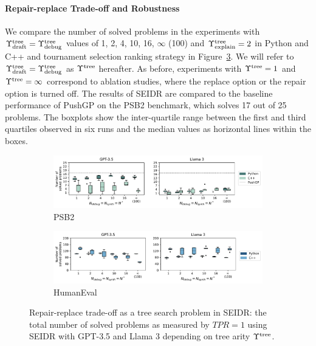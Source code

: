 \newpage
\paragraph{Repair-replace Trade-off and Robustness}
\label{sec:seidr-treearity-ollama}\label{sec:seidr-results-rqllama}

We compare the number of solved problems in the experiments with $\Upsilon^\text{tree}_\text{draft}=\Upsilon^\text{tree}_\text{debug}$ values of 1, 2, 4, 10, 16, $\infty$ (100) and $\Upsilon^\text{tree}_\text{explain}=2$ in Python and C++ and tournament selection ranking strategy in Figure~\ref{fig:repair-replace-trade-off-generalizability}. 
We will refer to  $\Upsilon^\text{tree}_\text{draft}=\Upsilon^\text{tree}_\text{debug}$ as $\Upsilon^\text{tree}$ hereafter.
As before, experiments with $\Upsilon^\text{tree}=1$ and $\Upsilon^\text{tree}=\infty$ correspond to ablation studies, where the replace option or the repair option is turned off. 
The results of SEIDR are compared to the baseline performance of PushGP on the PSB2 benchmark, which solves 17 out of 25 problems. 
The boxplots show the inter-quartile range between the first and third quartiles observed in six runs and the median values as horizontal lines within the boxes. 

\begin{figure}
\begin{subfigure}{\linewidth}
\centering
\includegraphics[width=\linewidth, trim={0mm 0mm 0mm 0mm}]{images/num_solved_problem_psb2_6runs_boxplot_v5.pdf}
  \caption{PSB2}
  \label{fig:num-solved-psb2-gpt3.5}
\end{subfigure}
\begin{subfigure}{\linewidth}
\centering
\includegraphics[width=\linewidth, trim={0mm 0mm 0mm 0mm}]{images/num_solved_problem_humaneval_6runs_boxplot_v5.pdf}
  \caption{HumanEval}
  \label{fig:num-solved-he-gpt3.5}
\end{subfigure}
\caption{Repair-replace trade-off as a tree search problem in SEIDR: the total number of solved problems as measured by $TPR=1$ using SEIDR with GPT-3.5 and Llama 3 depending on tree arity $\Upsilon^\text{tree}$.}
\label{fig:repair-replace-trade-off-generalizability}
\end{figure}


